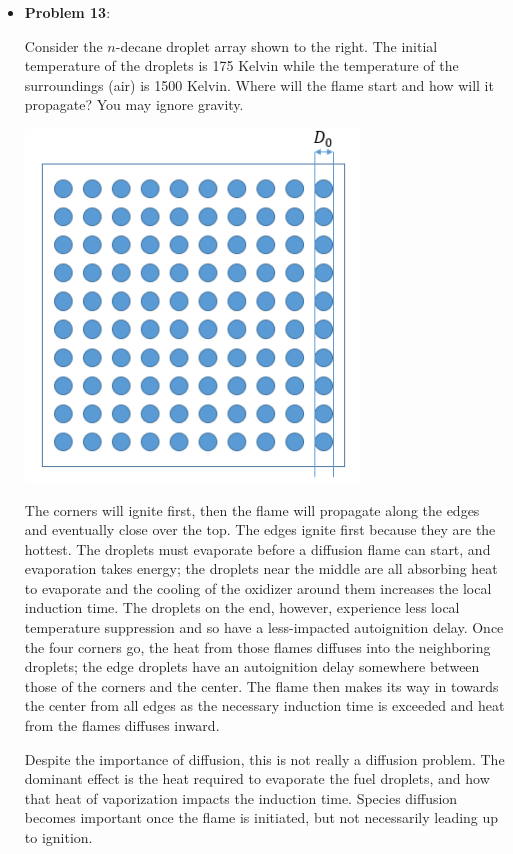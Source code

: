 \documentclass[11pt]{article}
\newcommand{\Item}[1]{\item \textbf{#1}:}
\newcommand{\Problem}[1]{\Item{Problem #1}}
\begin{document}
\begin{itemize}
\Problem{13}\\
\begin{minipage}{0.58\textwidth}
Consider the $n$-decane droplet array shown to the right. The initial temperature of the droplets is 175 Kelvin while the temperature of the surroundings (air) is 1500 Kelvin. Where will the flame start and how will it propagate? You may ignore gravity.
\end{minipage}
\begin{minipage}{0.38\textwidth}
\centering\includegraphics[width=0.7\textwidth]{Graphics/droplet_array.PNG}
\end{minipage}

\vspace{0.75cm}
The corners will ignite first, then the flame will propagate along the edges and eventually close over the top. The edges ignite first because they are the hottest. The droplets must evaporate before a diffusion flame can start, and evaporation takes energy; the droplets near the middle are all absorbing heat to evaporate and the cooling of the oxidizer around them increases the local induction time. The droplets on the end, however, experience less local temperature suppression and so have a less-impacted autoignition delay. Once the four corners go, the heat from those flames diffuses into the neighboring droplets; the edge droplets have an autoignition delay somewhere between those of the corners and the center. The flame then makes its way in towards the center from all edges as the necessary induction time is exceeded and heat from the flames diffuses inward.

Despite the importance of diffusion, this is not really a diffusion problem. The dominant effect is the heat required to evaporate the fuel droplets, and how that heat of vaporization impacts the induction time. Species diffusion becomes important once the flame is initiated, but not necessarily leading up to ignition.


\end{itemize}
\end{document}
